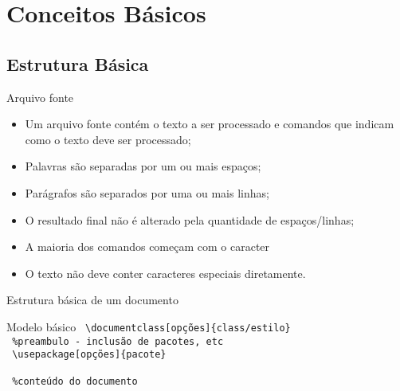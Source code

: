 \section{Conceitos B\'asicos}
\subsection{Estrutura B\'asica}

\begin{frame}{Arquivo fonte}

\begin{itemize}
\item Um arquivo fonte cont\'em o texto a ser processado e comandos que indicam como o texto deve ser processado;
\item Palavras s\~ao separadas por um ou mais espa{\c c}os;
\item Par\'agrafos s\~ao separados por uma ou mais linhas;
\item O resultado final n\~ao \'e alterado pela quantidade de espa{\c c}os/linhas;
\item A maioria dos comandos come{\c c}am com o caracter \;
\item O texto n\~ao deve conter caracteres especiais diretamente.

\end{itemize}
\end{frame}




\begin{frame}[fragile]{Estrutura b\'asica de um documento}
\begin{block}{Modelo b\'asico}
\verb| \documentclass[opções]{class/estilo} |\\
\verb| %preambulo - inclusão de pacotes, etc|\\
\verb| \usepackage[opções]{pacote}|\\
\verb| |\\
\verb| %conteúdo do documento|\\
\verb| |
\end{block}
\end{frame}


